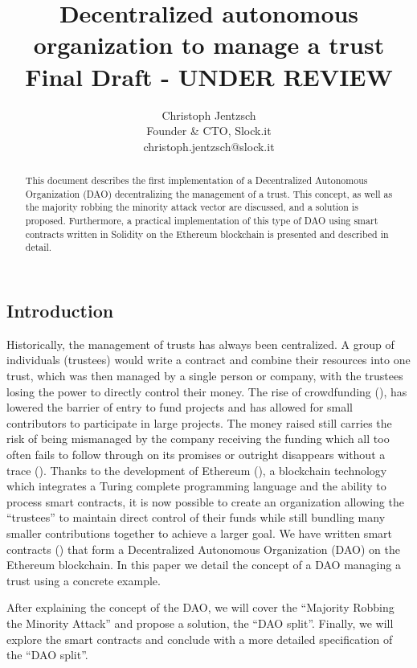 \documentclass[9pt,oneside]{amsart}
\title{Decentralized autonomous organization to manage a trust\\ {\smaller \textbf{Final Draft - UNDER REVIEW}}}
\author{
    Christoph Jentzsch\\
    Founder \& CTO, Slock.it\\
    christoph.jentzsch@slock.it
}
\begin{document}
\begin{abstract}
This document describes the first implementation of a Decentralized Autonomous Organization (DAO) decentralizing the management of a trust. This concept, as well as the majority robbing the minority attack vector are discussed, and a solution is proposed. Furthermore, a practical implementation of this type of DAO using smart contracts written in Solidity on the Ethereum blockchain is presented and described in detail.
\end{abstract}

\maketitle

\setlength{\columnsep}{20pt}
\begin{multicols}{2}

\section{Introduction}\label{sec:introduction}

Historically, the management of trusts has always been centralized. A group of individuals (trustees) would write a contract and combine their resources into one trust, which was then managed by a single person or company, with the trustees losing the power to directly control their money. The rise of crowdfunding (\cite{2015CFReport}), has lowered the barrier of entry to fund projects and has allowed for small contributors to participate in large projects. The money raised still carries the risk of being mismanaged by the company receiving the funding which all too often fails to follow through on its promises or outright disappears without a trace (\cite{9MostDisgracefulCrowdFundings, CrowdfundingFailTC}). Thanks to the development of Ethereum (\cite{buterin2013ethereum,Wood2014ethereum}), a blockchain technology which integrates a Turing complete programming language and the ability to process smart contracts, it is now possible to create an organization allowing the “trustees” to maintain direct control of their funds while still bundling many smaller contributions together to achieve a larger goal. We have written smart contracts (\cite{szabo1997formalizing, miller1997future}) that form a Decentralized Autonomous Organization (DAO) on the Ethereum blockchain. In this paper we detail the concept of a DAO managing a trust using a concrete example.

After explaining the concept of the DAO, we will cover the ``Majority Robbing the Minority Attack'' and propose a solution, the ``DAO split''. Finally, we will explore the smart contracts and conclude with a more detailed specification of the ``DAO split''.


\end{multicols}
\end{document}
